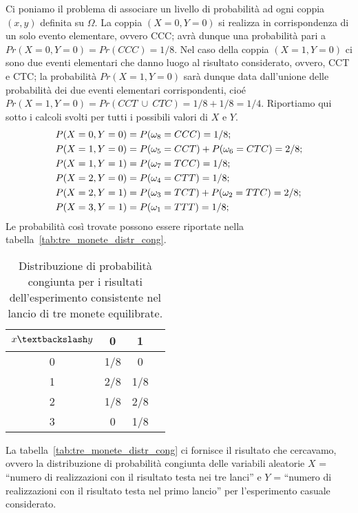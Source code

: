 Ci poniamo il problema di associare un livello di probabilità ad ogni coppia $(x, y)$ definita su $\Omega$. 
La coppia $(X = 0, Y = 0)$ si realizza in corrispondenza di un solo evento elementare, ovvero CCC; avrà dunque una probabilità pari a $Pr(X=0, Y=0) = Pr(CCC) = 1/8$.
Nel caso della coppia $(X = 1, Y = 0)$ ci sono due eventi elementari che danno luogo al risultato considerato, ovvero, CCT e CTC; la probabilità $Pr(X=1, Y=0)$ sarà dunque data dall'unione delle probabilità dei due eventi elementari corrispondenti, cioé $Pr(X=1, Y=0) = Pr(CCT \:\cup\: CTC) = 1/8 + 1/8 = 1/4$.
Riportiamo qui sotto i calcoli svolti per tutti i possibili valori di $X$ e $Y$.
\begin{align}
P(X = 0, Y = 0) &= P(\omega_8 = CCC) = 1/8; \notag\\
P(X = 1, Y = 0) &= P(\omega_5 = CCT) + P(\omega_6 = CTC) = 2/8; \notag\\
P(X = 1, Y = 1) &= P(\omega_7 = TCC) = 1/8; \notag\\
P(X = 2, Y = 0) &= P(\omega_4 = CTT) = 1/8; \notag\\
P(X = 2, Y = 1) &= P(\omega_3 = TCT) + P(\omega_2 = TTC) = 2/8; \notag\\
P(X = 3, Y = 1) &= P(\omega_1 = TTT) = 1/8; \notag
\end{align}
\noindent Le probabilità così trovate possono essere riportate nella tabella~\ref{tab:tre_monete_distr_cong}.
\begin{table}[h!]
\caption{Distribuzione di probabilità congiunta per i risultati dell'esperimento consistente nel lancio di tre monete equilibrate.}
\label{tab:tre_monete_distr_cong}
\begin{center}
\begin{tabular}{c|ccc}
\toprule
$x\textbackslash y$ & 0 & 1 \\
\midrule
0 & 1/8 & 0 \\
1 & 2/8 & 1/8 \\
2 & 1/8 & 2/8 \\
3 & 0   & 1/8 \\
\bottomrule
\end{tabular}
\end{center}
\label{default}
\end{table}%
La tabella~\ref{tab:tre_monete_distr_cong} ci fornisce il risultato che cercavamo, ovvero la distribuzione di probabilità congiunta delle variabili aleatorie $X$ = ``numero di realizzazioni con il risultato testa nei tre lanci'' e $Y$ = ``numero di realizzazioni con il risultato testa nel primo lancio'' per l'esperimento casuale considerato.

